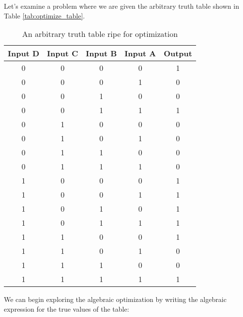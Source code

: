     Let's examine a problem where we are given the arbitrary truth table shown in Table \ref{tab:optimize_table}.

    \begin{table}
        \begin{tabular}{c c c c | c}
            \toprule
            Input D & Input C & Input B & Input A & Output \\
            \midrule
                0    &    0     &    0     &    0     &    1    \\
                0    &    0     &    0     &    1     &    0    \\
                0    &    0     &    1     &    0     &    0    \\
                0    &    0     &    1     &    1     &    1    \\
                0    &    1     &    0     &    0     &    0    \\
                0    &    1     &    0     &    1     &    0    \\
                0    &    1     &    1     &    0     &    0    \\
                0    &    1     &    1     &    1     &    0    \\
                1    &    0     &    0     &    0     &    1    \\
                1    &    0     &    0     &    1     &    1    \\
                1    &    0     &    1     &    0     &    1    \\
                1    &    0     &    1     &    1     &    1    \\
                1    &    1     &    0     &    0     &    1    \\
                1    &    1     &    0     &    1     &    0    \\
                1    &    1     &    1     &    0     &    0    \\
                1    &    1     &    1     &    1     &    1    \\
            \bottomrule
        \end{tabular}
        \caption[Optimization Truth Table]{An arbitrary truth table ripe for optimization}
    \end{table}

    We can begin exploring the algebraic optimization by writing the algebraic expression for the true values of the table:
    
